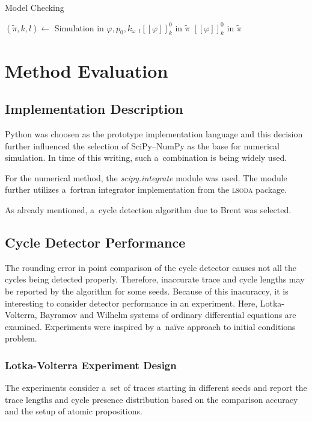 \documentclass[12pt,twoside,draft]{fithesis}
\begin{document}
\begin{algorithm}
	\caption{Model Checking}
	\label{modelChecking}
	\begin{algorithmic}[1]
		\STATE $(\tilde{\pi},k,l)\leftarrow$ Simulation in $\varphi, p_0, k_\omega$
			\RETURN ${}_l[[\varphi]]_k^0$ in $\tilde{\pi}$ 
		\ELSE
			\RETURN $[[\varphi]]_k^0$ in $\tilde{\pi}$ 
		\ENDIF
	\end{algorithmic}
\end{algorithm}

\chapter{Method Evaluation}
\section{Implementation Description}
Python was choosen as the prototype implementation language and this
decision further influenced the selection of SciPy--NumPy as the base
for numerical simulation. In time of this writing, such a~combination
is being widely used\cite{wiki:python}.

For the numerical method, the \emph{scipy.integrate} module was used.
The module further utilizes a~fortran integrator implementation from
the \textsc{lsoda} package\cite{scipy:odeint}. 

As already mentioned, a~cycle detection algorithm due to Brent was
selected.

\section{Cycle Detector Performance}
The rounding error in point comparison of the cycle detector causes
not all the cycles being detected properly. Therefore, inaccurate trace
and cycle lengths may be reported by the algorithm for some seeds.
Because of this inacuraccy, it is interesting to consider detector
performance in an experiment. Here, Lotka-Volterra, Bayramov and Wilhelm
systems of ordinary differential equations are examined. Experiments
were inspired by a~na\"{i}ve approach to initial conditions
problem\cite{sven}.

\subsection*{Lotka-Volterra Experiment Design}
The experiments consider a~set of traces starting in different seeds
and report the trace lengths and cycle presence distribution based
on the comparison accuracy and the setup of atomic propositions.
\end{document}
